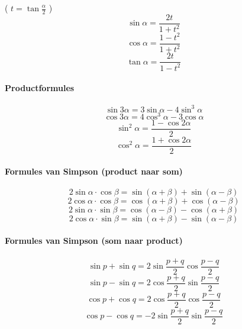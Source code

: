  ( $t = \tan \frac{\alpha}{2} $ )
   \[
	   \sin \alpha = \frac{2t}{1+t^2} 
   \]
   \[
	   \cos \alpha = \frac{1-t^2}{1+t^2} 
   \]
   \[
	   \tan \alpha = \frac{2t}{1-t^2} 
   \]
  
\paragraph{Productformules}
\label{sec:ProductformulesGonio}

   \[
	   \sin 3\alpha = 3 \sin \alpha - 4 \sin^3 \alpha
   \]
   \[
	   \cos 3\alpha = 4 \cos^3 \alpha - 3\cos\alpha 
   \]
   \[
	   \sin^2 \alpha = \frac{1-\cos 2\alpha}{2}
   \]
   \[
	   \cos^2 \alpha = \frac{1+\cos 2\alpha}{2} 
   \]
  \newpage
  
\paragraph{Formules van Simpson (product naar som)}
\label{sec:FormulesVanSimpsonPS}
   \[
	   2\sin\alpha \cdot \cos\beta = \sin ( \alpha + \beta ) + \sin ( \alpha - \beta )
   \]
   \[
	   2\cos\alpha \cdot \cos\beta = \cos ( \alpha + \beta ) + \cos ( \alpha - \beta ) 
   \]
   \[
	   2\sin\alpha \cdot \sin\beta = \cos ( \alpha - \beta ) - \cos ( \alpha + \beta ) 
   \]
   \[
	   2\cos\alpha \cdot \sin\beta = \sin ( \alpha + \beta ) - \sin ( \alpha - \beta ) 
   \]
   
\paragraph{Formules van Simpson (som naar product)}
\label{sec:FormulesVanSimpsonSP}

   \[
	   \sin p + \sin q = 2\sin\frac{p+q}{2}\cos\frac{p-q}{2} 
   \]
   \[
	   \sin p - \sin q = 2\cos\frac{p+q}{2}\sin\frac{p-q}{2} 
   \]
   \[
	   \cos p + \cos q = 2\cos\frac{p+q}{2}\cos\frac{p-q}{2} 
   \]
   \[
	   \cos p - \cos q = -2\sin\frac{p+q}{2}\sin\frac{p-q}{2} 
   \]
